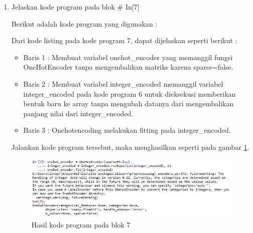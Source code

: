 \begin{enumerate}
\item Jelaskan kode program pada blok \# In[7]
	\par Berikut adalah kode program yang digunakan :
	
	\par Dari kode listing pada kode program 7, dapat dijelaskan seperti berikut :
	\begin{itemize}
	\item Baris 1	: Membuat variabel onehot\_encoder yang memanggil fungsi OneHotEncoder tanpa mengembalikan matriks karena sparse=false.
	\item Baris 2	: Membuat variabel integer\_encoded memanggil variabel integer\_encoded pada kode program 6 untuk dieksekusi memberikan bentuk baru ke array tanpa mengubah datanya dari mengembalikan panjang nilai dari integer\_encoded.
	\item Baris 3	: Onehotencoding melakukan fitting pada integer\_encoded.
	\end{itemize}
	\par Jalankan kode program tersebut, maka menghasilkan seperti pada gambar \ref{andri7}.
		\begin{figure}[!hbtp]
		\centering
		\includegraphics[scale=0.5]{figures/chapter7/andri7.jpg}
		\caption{Hasil kode program pada blok 7}
		\label{andri7}
		\end{figure}


\end{enumerate}
